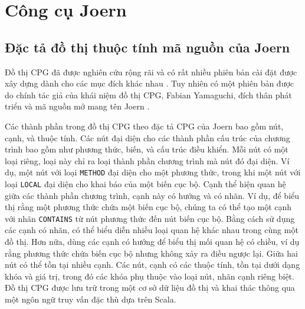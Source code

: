 \section{Công cụ Joern}

\subsection{Đặc tả đồ thị thuộc tính mã nguồn của Joern}


Đồ thị CPG đã được nghiên cứu rộng rãi và có rất nhiều phiên bản cài đặt được xây dựng dành cho các mục đích khác nhau \cite{ kuchler2022representing, weiss2022language, keirsgieter2020graft}.
Tuy nhiên có một phiên bản được do chính tác giả của khái niệm đồ thị CPG, Fabian Yamaguchi, đích thân phát triển và mã nguồn mở mang tên Joern \cite{joernJoernHunteraposs}.

Các thành phần trong đồ thị CPG theo đặc tả CPG của Joern bao gồm nút, cạnh, và thuộc tính.
Các nút đại diện cho các thành phần cấu trúc của chương trình bao gồm như phương thức, biến, và cấu trúc điều khiển.
Mỗi nút có một loại riêng, loại này chỉ ra loại thành phần chương trình mà nút đó đại diện.
Ví dụ, một nút với loại \texttt{METHOD} đại diện cho một phương thức, trong khi một nút với loại \texttt{LOCAL} đại diện cho khai báo của một biến cục bộ.
Cạnh thể hiện quan hệ giữa các thành phần chương trình, cạnh này có hướng và có nhãn.
Ví dụ, để biểu thị rằng một phương thức chứa một biến cục bộ, chúng ta có thể tạo một cạnh với nhãn \texttt{CONTAINS} từ nút phương thức đến nút biến cục bộ.
Bằng cách sử dụng các cạnh có nhãn, có thể biểu diễn nhiều loại quan hệ khác nhau trong cùng một đồ thị.
Hơn nữa, dùng các cạnh có hướng để biểu thị mối quan hệ có chiều, ví dụ rằng phương thức chứa biến cục bộ nhưng không xảy ra điều ngược lại.
Giữa hai nút có thể tồn tại nhiều cạnh.
Các nút, cạnh có các thuộc tính, tồn tại dưới dạng khóa và giá trị, trong đó các khóa phụ thuộc vào loại nút, nhãn cạnh riêng biệt.
Đồ thị CPG được lưu trữ trong một cơ sở dữ liệu đồ thị và khai thác thông qua một ngôn ngữ truy vấn đặc thù dựa trên Scala.

